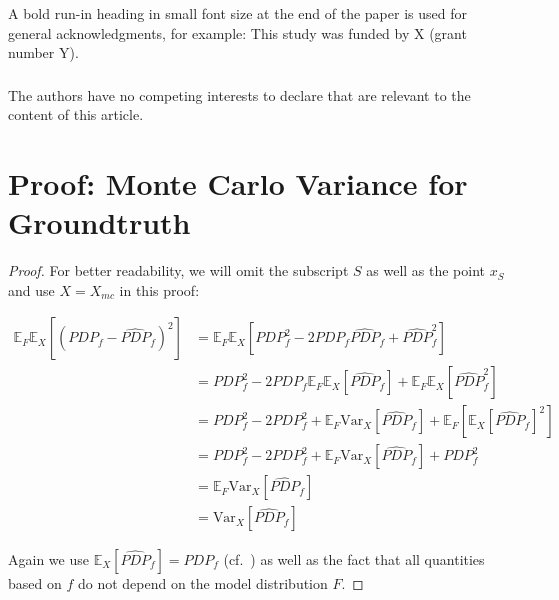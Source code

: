 \documentclass[runningheads]{llncs}
\begin{document}
\begin{credits}
    \subsubsection{\ackname} A bold run-in heading in small font size at the end of the paper is used for
    general acknowledgments, for example: This study was funded by X (grant number
    Y).

    \subsubsection{\discintname}
    The authors have no competing interests to declare that are relevant to the
    content of this article.
\end{credits}

%



\newpage
\appendix
\section{Proof: Monte Carlo Variance for Groundtruth}\label{app:proof-mc-variance}
\begin{proof}
    For better readability, we will omit the subscript $S$ as well as the point $x_S$ and use $X=X_{mc}$ in this proof:

    \begin{align*}
        \mathbb{E}_F\mathbb{E}_X[(PDP_f - \widehat{PDP}_f)^2] & = \mathbb{E}_F\mathbb{E}_X[PDP_f^2 - 2PDP_f \widehat{PDP}_f + \widehat{PDP}_f^2]                                 \\
                                                              & = PDP_f^2 - 2PDP_f \mathbb{E}_F\mathbb{E}_X[\widehat{PDP}_f] + \mathbb{E}_F\mathbb{E}_X[\widehat{PDP}_f^2]       \\
                                                              & = PDP_f^2 - 2PDP_f^2 + \mathbb{E}_F\text{Var}_X[\widehat{PDP}_f] + \mathbb{E}_F[\mathbb{E}_X[\widehat{PDP}_f]^2] \\
                                                              & = PDP_f^2 - 2PDP_f^2 + \mathbb{E}_F\text{Var}_X[\widehat{PDP}_f] + PDP_f^2                                       \\
                                                              & = \mathbb{E}_F\text{Var}_X[\widehat{PDP}_f]                                                                      \\
                                                              & = \text{Var}_X[\widehat{PDP}_f]
    \end{align*}

    \noindent Again we use $\mathbb{E}_X[\widehat{PDP}_{f}] = PDP_{f}$ (cf.~\cite{molnar_relating_2023}) as well as the fact
    that all quantities based on $f$ do not depend on the model distribution $F$.
\end{proof}
\end{document}
